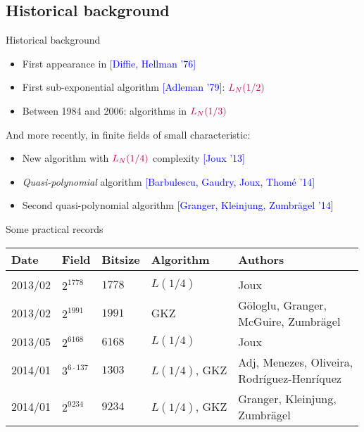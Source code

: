 \documentclass[xcolor=x11names,compress]{beamer}
\theoremstyle{break}
\theoremstyle{sc}
\theoremstyle{definition}
\theoremstyle{remark}
\begin{document}
\subsection{Historical background}
\begin{frame}{Historical background}
  \begin{itemize}
    \item First appearance in \textcolor{blue}{[Diffie, Hellman '76]}
    \item First sub-exponential algorithm \textcolor{blue}{[Adleman '79]}:
      $\textcolor{purple}{L_N(1/2)}$
    \item Between 1984 and 2006: algorithms in $\textcolor{purple}{L_N(1/3)}$
\end{itemize}
 And more recently, in finite fields of small characteristic:
  \begin{itemize}
    \item New algorithm with $\textcolor{purple}{L_N(1/4)}$ complexity
      \textcolor{blue}{[Joux '13]}
    \item \emph{Quasi-polynomial} algorithm \textcolor{blue}{[Barbulescu,
      Gaudry, Joux, Thomé '14]}
    \item Second quasi-polynomial algorithm \textcolor{blue}{[Granger,
      Kleinjung, Zumbrägel '14]}
  \end{itemize}
\end{frame}
\begin{frame}{Some practical records}
  \begin{tabular}[here]{lllll}
    Date & Field & Bitsize & Algorithm & Authors \\
    \hline
    & & & & \\
    2013/02 & $2^{1778}$ & $1778$ & $L(1/4)$ & Joux \\
    2013/02 & $2^{1991}$ & $1991$ & GKZ & \makecell[lc]{Göloglu, Granger, \\ McGuire,
    Zumbrägel} \\
    2013/05 & $2^{6168}$ & $6168$ & $L(1/4)$ & Joux \\
    2014/01 & $3^{6\cdot137}$ & $1303$ & $L(1/4)$, GKZ & \makecell[lc]{Adj,
    Menezes, Oliveira, \\ Rodr\'iguez-Henr\'iquez}\\
    2014/01 & $2^{9234}$ & $9234$ & $L(1/4)$, GKZ & \makecell[lc]{Granger,
    Kleinjung,\\Zumbrägel}\\
    

  \end{tabular}
\end{frame}
\end{document}
